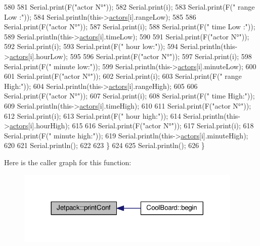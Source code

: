 \begin{DoxyCode}
580 
581         Serial.print(F(\textcolor{stringliteral}{"actor N°"}));
582         Serial.print(i);
583         Serial.print(F(\textcolor{stringliteral}{" range Low :"}));
584         Serial.println(this->\hyperlink{class_jetpack_a7e16d2f97837f9712a2e6de1c50d99db}{actors}[i].rangeLow);
585 
586         Serial.print(F(\textcolor{stringliteral}{"actor N°"}));
587         Serial.print(i);
588         Serial.print(F(\textcolor{stringliteral}{" time Low :"}));
589         Serial.println(this->\hyperlink{class_jetpack_a7e16d2f97837f9712a2e6de1c50d99db}{actors}[i].timeLow);
590 
591         Serial.print(F(\textcolor{stringliteral}{"actor N°"}));
592         Serial.print(i);
593         Serial.print(F(\textcolor{stringliteral}{" hour low:"}));
594         Serial.println(this->\hyperlink{class_jetpack_a7e16d2f97837f9712a2e6de1c50d99db}{actors}[i].hourLow);
595 
596         Serial.print(F(\textcolor{stringliteral}{"actor N°"}));
597         Serial.print(i);
598         Serial.print(F(\textcolor{stringliteral}{" minute low:"}));
599         Serial.println(this->\hyperlink{class_jetpack_a7e16d2f97837f9712a2e6de1c50d99db}{actors}[i].minuteLow);
600 
601         Serial.print(F(\textcolor{stringliteral}{"actor N°"}));
602         Serial.print(i);
603         Serial.print(F(\textcolor{stringliteral}{" range High:"}));
604         Serial.println(this->\hyperlink{class_jetpack_a7e16d2f97837f9712a2e6de1c50d99db}{actors}[i].rangeHigh);
605 
606         Serial.print(F(\textcolor{stringliteral}{"actor N°"}));
607         Serial.print(i);
608         Serial.print(F(\textcolor{stringliteral}{" time High:"}));
609         Serial.println(this->\hyperlink{class_jetpack_a7e16d2f97837f9712a2e6de1c50d99db}{actors}[i].timeHigh);
610 
611         Serial.print(F(\textcolor{stringliteral}{"actor N°"}));
612         Serial.print(i);
613         Serial.print(F(\textcolor{stringliteral}{" hour high:"}));
614         Serial.println(this->\hyperlink{class_jetpack_a7e16d2f97837f9712a2e6de1c50d99db}{actors}[i].hourHigh);
615 
616         Serial.print(F(\textcolor{stringliteral}{"actor N°"}));
617         Serial.print(i);
618         Serial.print(F(\textcolor{stringliteral}{" minute high:"}));
619         Serial.println(this->\hyperlink{class_jetpack_a7e16d2f97837f9712a2e6de1c50d99db}{actors}[i].minuteHigh);
620 
621         Serial.println(); 
622 
623     \}
624 
625     Serial.println();
626 \}
\end{DoxyCode}
Here is the caller graph for this function\+:\nopagebreak
\begin{figure}[H]
\begin{center}
\leavevmode
\includegraphics[width=305pt]{df/d1d/class_jetpack_ac54a7bb4f9166bee32052253d9b1d306_icgraph}
\end{center}
\end{figure}

